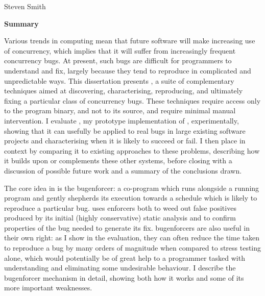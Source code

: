 \cleardoublepage
\begin{center}
\Large \mytitle
\end{center}
\begin{center}
\large Steven Smith
\end{center}
\vspace{10mm}
\begin{center}
\textbf{\large Summary}
\end{center}


\noindent
Various trends in computing mean that future software will make
increasing use of concurrency, which implies that it will suffer from
increasingly frequent concurrency bugs.  At present, such bugs are
difficult for programmers to understand and fix, largely because they
tend to reproduce in complicated and unpredictable ways.  This
dissertation presents {\technique}, a suite of complementary
techniques aimed at discovering, characterising, reproducing, and
ultimately fixing a particular class of concurrency bugs.  These
techniques require access only to the program binary, and not to its
source, and require minimal manual intervention.  I evaluate
{\implementation}, my prototype implementation of {\technique},
experimentally, showing that it can usefully be applied to real bugs
in large existing software projects and characterising when it is
likely to succeed or fail.  I then place {\technique} in context by
comparing it to existing approaches to these problems, describing how
it builds upon or complements these other systems, before closing with
a discussion of possible future work and a summary of the conclusions
drawn.

The core idea in {\technique} is the \gls{bugenforcer}: a co-program
which runs alongside a running program and gently shepherds its
execution towards a schedule which is likely to reproduce a particular
bug.  {\Technique} uses enforcers both to weed out false positives
produced by its initial (highly conservative) static analysis and to
confirm properties of the bug needed to generate its fix.
\Glspl{bugenforcer} are also useful in their own right: as I show in
the evaluation, they can often reduce the time taken to reproduce a
bug by many orders of magnitude when compared to stress testing alone,
which would potentially be of great help to a programmer tasked with
understanding and eliminating some undesirable behaviour.  I describe
the \gls{bugenforcer} mechanism in detail, showing both how it works
and some of its more important weaknesses.

\vspace*{\fill}

